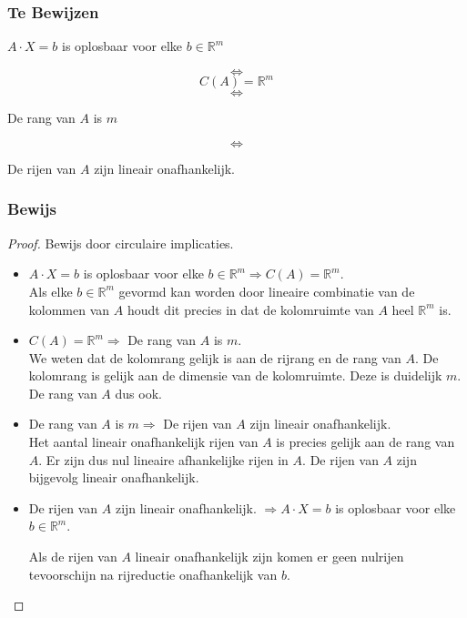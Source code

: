 \documentclass[lineaire_algebra_oplossingen.tex]{subfiles}
\begin{document}
\subsubsection*{Te Bewijzen}
\begin{center}
$A\cdot X = b$ is oplosbaar voor elke $b\in \mathbb{R}^m$
\end{center}
\[\Leftrightarrow\]
\[C(A) = \mathbb{R}^m\]
\[\Leftrightarrow\]
\begin{center}
De rang van $A$ is $m$
\end{center}
\[\Leftrightarrow\]
\begin{center}
De rijen van $A$ zijn lineair onafhankelijk.
\end{center}
\subsubsection*{Bewijs}
\begin{proof}
Bewijs door circulaire implicaties.
\begin{itemize}
\item
$A\cdot X = b$ is oplosbaar voor elke $b\in \mathbb{R}^m \Rightarrow C(A) = \mathbb{R}^m$.\\
Als elke $b\in \mathbb{R}^m$ gevormd kan worden door lineaire combinatie van de kolommen van $A$ houdt dit precies in dat de kolomruimte van $A$ heel $\mathbb{R}^m$ is.
\item
$C(A) = \mathbb{R}^m \Rightarrow $ De rang van $A$ is $m$.\\
We weten dat de kolomrang gelijk is aan de rijrang en de rang van $A$. De kolomrang is gelijk aan de dimensie van de kolomruimte. Deze is duidelijk $m$. De rang van $A$ dus ook.

\item
 De rang van $A$ is $m \Rightarrow$ De rijen van $A$ zijn lineair onafhankelijk.\\
Het aantal lineair onafhankelijk rijen van $A$ is precies gelijk aan de rang van $A$. Er zijn dus nul lineaire afhankelijke rijen in $A$. De rijen van $A$ zijn bijgevolg lineair onafhankelijk.

\item
De rijen van $A$ zijn lineair onafhankelijk. $\Rightarrow A\cdot X = b$ is oplosbaar voor elke $b\in \mathbb{R}^m$.

Als de rijen van $A$ lineair onafhankelijk zijn komen er geen nulrijen tevoorschijn na rijreductie onafhankelijk van $b$.
\end{itemize}
\end{proof}
\end{document}
